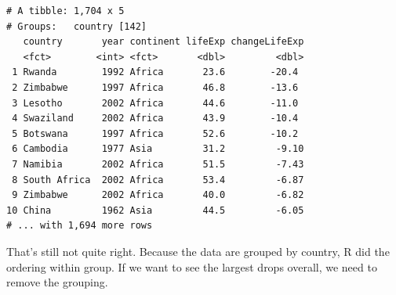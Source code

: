 \documentclass[]{krantz}
\makeatletter
\newenvironment{Shaded}{\begin{snugshade}}{\end{snugshade}}
\newcommand{\DataTypeTok}[1]{\textcolor[rgb]{0.27,0.27,0.27}{#1}}
\newcommand{\DecValTok}[1]{\textcolor[rgb]{0.06,0.06,0.06}{#1}}
\newcommand{\KeywordTok}[1]{\textcolor[rgb]{0.27,0.27,0.27}{\textbf{#1}}}
\newcommand{\NormalTok}[1]{#1}
\newcommand{\OperatorTok}[1]{\textcolor[rgb]{0.43,0.43,0.43}{\textbf{#1}}}
\newcommand{\StringTok}[1]{\textcolor[rgb]{0.5,0.5,0.5}{#1}}
\newenvironment{kframe}{%
\medskip{}
\setlength{\fboxsep}{.8em}
 \def\at@end@of@kframe{}%
 \ifinner\ifhmode%
  \def\at@end@of@kframe{\end{minipage}}%
  \begin{minipage}{\columnwidth}%
 \fi\fi%
 \def\FrameCommand##1{\hskip\@totalleftmargin \hskip-\fboxsep
 \colorbox{shadecolor}{##1}\hskip-\fboxsep
     \hskip-\linewidth \hskip-\@totalleftmargin \hskip\columnwidth}%
 \MakeFramed {\advance\hsize-\width
   \@totalleftmargin\z@ \linewidth\hsize
   \@setminipage}}%
 {\par\unskip\endMakeFramed%
 \at@end@of@kframe}
\renewenvironment{Shaded}{\begin{kframe}}{\end{kframe}}
\makeatother
\begin{document}
\begin{verbatim}
# A tibble: 1,704 x 5
# Groups:   country [142]
   country       year continent lifeExp changeLifeExp
   <fct>        <int> <fct>       <dbl>         <dbl>
 1 Rwanda        1992 Africa       23.6        -20.4 
 2 Zimbabwe      1997 Africa       46.8        -13.6 
 3 Lesotho       2002 Africa       44.6        -11.0 
 4 Swaziland     2002 Africa       43.9        -10.4 
 5 Botswana      1997 Africa       52.6        -10.2 
 6 Cambodia      1977 Asia         31.2         -9.10
 7 Namibia       2002 Africa       51.5         -7.43
 8 South Africa  2002 Africa       53.4         -6.87
 9 Zimbabwe      2002 Africa       40.0         -6.82
10 China         1962 Asia         44.5         -6.05
# ... with 1,694 more rows
\end{verbatim}

That's still not quite right. Because the data are grouped by country, R did the ordering within group. If we want to see the largest drops overall, we need to remove the grouping.

\begin{Shaded}
\end{Shaded}
\end{document}
